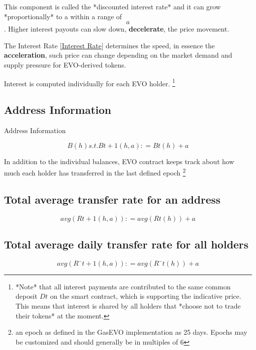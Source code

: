 This component is called the *discounted interest rate* and it can grow *proportionally* to a within a range of 
\begin{equation}
 [0, 0.24] a 
\end{equation}
.
Higher interest payouts can slow down, \textbf{decelerate}, the price movement. 

The Interest Rate \ref{Interest Rate} determines the speed, in essence the \textbf{acceleration}, such price can change depending on the market demand and supply pressure for EVO-derived tokens.

Interest is computed individually for each EVO holder. \footnote{
*Note* that all interest payments are contributed to the same common deposit $Dt$ on the smart contract, which is supporting the indicative price. This means that interest is shared by all holders that *choose not to trade their tokens* at the moment.}




\label{sec:Calculations}
\subsection{Address Information}
Address Information


\begin{equation}
B(h) s.t. Bt + 1(h, a): = Bt(h) + a 
\end{equation}


In addition to the individual balances, EVO contract keeps track about how much each holder has transferred in the last defined epoch \footnote{an epoch as defined in the GasEVO implementation as 25 days. Epochs may be customized and should generally be in multiples of 6}

\label{sec:Calculations}
\subsection{Total average transfer rate for an address}

\begin{equation}
avg(Rt + 1(h, a)): = avg(Rt(h)) + a
\end{equation}


\label{sec:Calculations}
\subsection{Total average daily transfer rate for all holders}
\begin{equation}
avg(R¯ t + 1(h, a)): = avg(R¯t(h)) + a
\end{equation}

